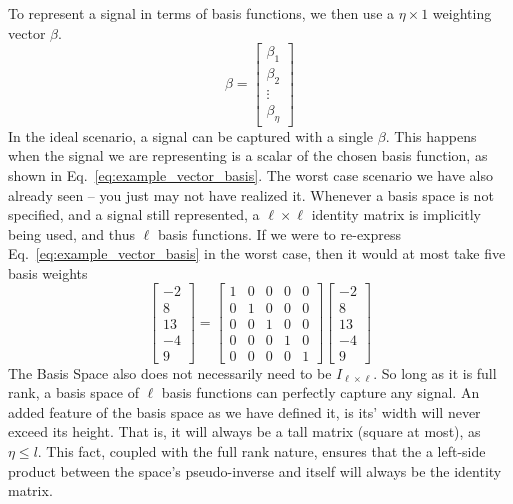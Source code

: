 To represent a signal in terms of basis functions, we then use a $\eta \times 1$ weighting vector $\beta$. 
\begin{equation}
    \beta = 
    \begin{bmatrix}
        \beta_1 \\ \beta_2 \\ \vdots \\ \beta_\eta
    \end{bmatrix}
\end{equation}
In the ideal scenario, a signal can be captured with a single $\beta$. This happens when the signal we are representing is a scalar of the chosen basis function, as shown in Eq.~\ref{eq:example_vector_basis}. The worst case scenario we have also already seen -- you just may not have realized it. Whenever a basis space is not specified, and a signal still represented, a $\ell \times \ell$ identity matrix is implicitly being used, and thus $\ell$ basis functions. If we were to re-express Eq.~\ref{eq:example_vector_basis} in the worst case, then it would at most take five basis weights
\begin{equation}
    \begin{bmatrix}
        -2\\ 8\\ 13\\ -4\\ 9
    \end{bmatrix}
    =
    \begin{bmatrix}
        1 & 0 & 0 & 0 & 0\\0 & 1 & 0 & 0 & 0\\ 0 & 0 & 1 & 0& 0 \\ 0 & 0 & 0 & 1 & 0\\ 0 & 0 & 0 & 0 & 1
    \end{bmatrix}
    \begin{bmatrix}
        -2\\ 8\\ 13\\ -4\\ 9
    \end{bmatrix}
\end{equation}
The Basis Space also does not necessarily need to be $I_{\ell \times \ell}$. So long as it is full rank, a basis space of $\ell$ basis functions can perfectly capture any signal. An added feature of the basis space as we have defined it, is its' width will never exceed its height. That is, it will always be a tall matrix (square at most), as $\eta \le l$. This fact, coupled with the full rank nature, ensures that the a left-side product between the space's pseudo-inverse and itself will always be the identity matrix.

